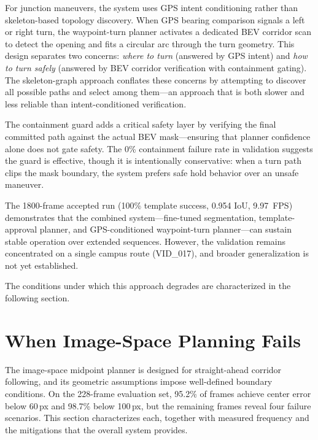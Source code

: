 \documentclass[12pt,letterpaper,oneside]{report}
\begin{document}
For junction maneuvers, the system uses GPS intent conditioning rather than skeleton-based topology discovery.  When GPS bearing comparison signals a left or right turn, the waypoint-turn planner activates a dedicated BEV corridor scan to detect the opening and fits a circular arc through the turn geometry.  This design separates two concerns: \emph{where to turn} (answered by GPS intent) and \emph{how to turn safely} (answered by BEV corridor verification with containment gating).  The skeleton-graph approach conflates these concerns by attempting to discover all possible paths and select among them---an approach that is both slower and less reliable than intent-conditioned verification.

The containment guard adds a critical safety layer by verifying the final committed path against the actual BEV mask---ensuring that planner confidence alone does not gate safety.  The 0\% containment failure rate in validation suggests the guard is effective, though it is intentionally conservative: when a turn path clips the mask boundary, the system prefers safe hold behavior over an unsafe maneuver.

The 1800-frame accepted run (100\% template success, 0.954 IoU, 9.97~FPS) demonstrates that the combined system---fine-tuned segmentation, template-approval planner, and GPS-conditioned waypoint-turn planner---can sustain stable operation over extended sequences.  However, the validation remains concentrated on a single campus route (VID\_017), and broader generalization is not yet established.

The conditions under which this approach degrades are characterized in the following section.


\section{When Image-Space Planning Fails}
\label{sec:failure_analysis}

The image-space midpoint planner is designed for straight-ahead corridor following, and its geometric assumptions impose well-defined boundary conditions.  On the 228-frame evaluation set, 95.2\% of frames achieve center error below 60\,px and 98.7\% below 100\,px, but the remaining frames reveal four failure scenarios.  This section characterizes each, together with measured frequency and the mitigations that the overall system provides.
\end{document}

